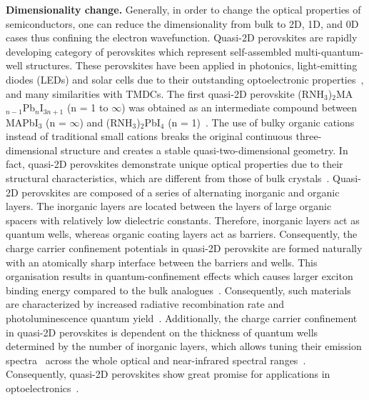 \documentclass[journal=chreay,manuscript=review]{achemso}
\begin{document}
% 
\textbf{Dimensionality change.}
Generally, in order to change the optical properties of semiconductors, one can reduce the dimensionality from bulk to 2D, 1D, and 0D cases thus confining the electron wavefunction. 
Quasi-2D perovskites are rapidly developing category of perovskites which represent self-assembled multi-quantum-well structures. These perovskites have been applied in photonics, light-emitting diodes (LEDs) and solar cells due to their outstanding optoelectronic  properties~\cite{byun2016efficient,cheng2020multiple,zhang2021high}, and many similarities with TMDCs. The first quasi-2D perovskite  (RNH$_3$)$_2$MA$_{n-1}$Pb$_n$I$_{3n+1}$ (n = 1 to $\infty$) was obtained as an intermediate compound between MAPbI$_3$ (n = $\infty$) and (RNH$_3$)$_2$PbI$_4$ (n = 1)~\cite{calabrese1991preparation}. The use of bulky organic cations instead of traditional small cations breaks the original continuous three-dimensional structure and creates a stable quasi-two-dimensional geometry. In fact, quasi-2D perovskites demonstrate unique optical properties due to their structural characteristics, which are different from those of bulk crystals~\cite{saidaminov2015high}. Quasi-2D perovskites are composed of a series of alternating inorganic and organic layers. The inorganic layers are located between the layers of large organic spacers with relatively low dielectric constants. Therefore, inorganic layers act as quantum wells, whereas organic coating layers act as barriers. Consequently, the charge carrier confinement potentials in quasi-2D perovskite are formed naturally with an atomically sharp interface between the barriers and wells. This organisation results in quantum-confinement effects which causes larger exciton binding energy compared to the bulk analogues~\cite{cheng2020multiple}. Consequently, such materials are characterized by increased radiative recombination rate and photoluminescence quantum yield~\cite{wang2016perovskite}. Additionally, the charge carrier confinement in quasi-2D perovskites is dependent on the thickness of quantum wells determined by the number of inorganic layers, which allows tuning their emission spectra~\cite{quan2018perovskites} across the whole optical and near-infrared spectral ranges~\cite{chu2020large,he2019high,wu2019alternative}. Consequently, quasi-2D perovskites show great promise for applications in optoelectronics~\cite{yang2018oriented, fu2019tailoring, tonkaev2021acceleration}.

\end{document}
